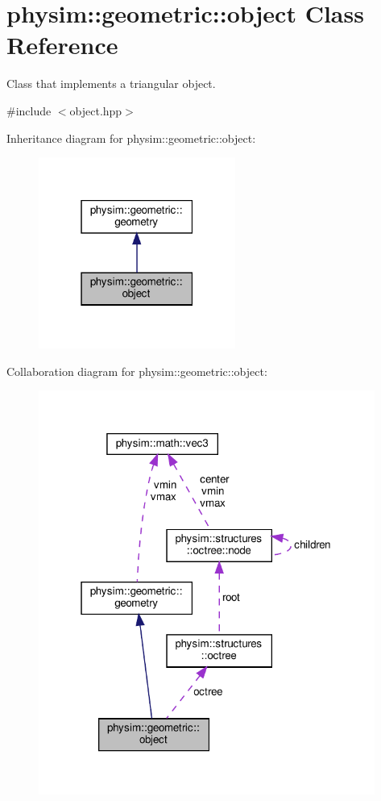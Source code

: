 \hypertarget{classphysim_1_1geometric_1_1object}{}\section{physim\+:\+:geometric\+:\+:object Class Reference}
\label{classphysim_1_1geometric_1_1object}


Class that implements a triangular object.  




{\ttfamily \#include $<$object.\+hpp$>$}



Inheritance diagram for physim\+:\+:geometric\+:\+:object\+:\nopagebreak
\begin{figure}[H]
\begin{center}
\leavevmode
\includegraphics[width=183pt]{classphysim_1_1geometric_1_1object__inherit__graph}
\end{center}
\end{figure}


Collaboration diagram for physim\+:\+:geometric\+:\+:object\+:\nopagebreak
\begin{figure}[H]
\begin{center}
\leavevmode
\includegraphics[width=313pt]{classphysim_1_1geometric_1_1object__coll__graph}
\end{center}
\end{figure}
